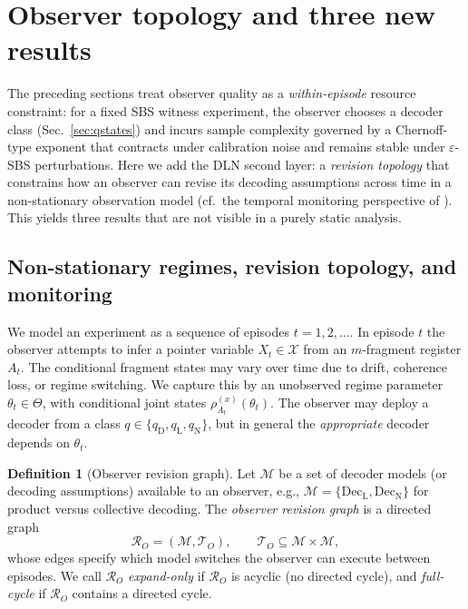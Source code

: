 \documentclass[11pt]{article}
\newcommand{\cX}{\mathcal{X}}
\newcommand{\cR}{\mathcal{R}}
\newcommand{\1}{\mathbf{1}}
\theoremstyle{definition}
\newtheorem{definition}{Definition}
\theoremstyle{plain}
\begin{document}
\section{Observer topology and three new results}
\label{sec:observer-topology}

The preceding sections treat observer quality as a \emph{within-episode} resource constraint: for a fixed SBS witness experiment, the observer chooses a decoder class (Sec.~\ref{sec:qstates}) and incurs sample complexity governed by a Chernoff-type exponent that contracts under calibration noise and remains stable under $\varepsilon$-SBS perturbations.
Here we add the DLN second layer: a \emph{revision topology} that constrains how an observer can revise its decoding assumptions across time in a non-stationary observation model (cf.\ the temporal monitoring perspective of \citet{MironowiczKorbiczHorodecki2017}).
This yields three results that are not visible in a purely static analysis.

\subsection{Non-stationary regimes, revision topology, and monitoring}

We model an experiment as a sequence of episodes $t=1,2,\dots$.
In episode $t$ the observer attempts to infer a pointer variable $X_t\in\cX$ from an $m$-fragment register $A_t$.
The conditional fragment states may vary over time due to drift, coherence loss, or regime switching.
We capture this by an unobserved regime parameter $\theta_t\in\Theta$, with conditional joint states
$\rho_{A_t}^{(x)}(\theta_t)$.
The observer may deploy a decoder from a class $q\in\{q_{\mathrm{D}},q_{\mathrm{L}},q_{\mathrm{N}}\}$, but in general the \emph{appropriate} decoder depends on $\theta_t$.

\begin{definition}[Observer revision graph]
\label{def:revision-graph-q}
Let $\mathcal{M}$ be a set of decoder models (or decoding assumptions) available to an observer, e.g.,
$\mathcal{M}=\{\mathrm{Dec}_{\mathrm{L}},\mathrm{Dec}_{\mathrm{N}}\}$ for product versus collective decoding.
The \emph{observer revision graph} is a directed graph
\[
\cR_O=(\mathcal{M},\mathcal{T}_O),
\qquad
\mathcal{T}_O\subseteq \mathcal{M}\times\mathcal{M},
\]
whose edges specify which model switches the observer can execute between episodes.
We call $\cR_O$ \emph{expand-only} if $\cR_O$ is acyclic (no directed cycle), and \emph{full-cycle} if $\cR_O$ contains a directed cycle.
\end{definition}
\end{document}
